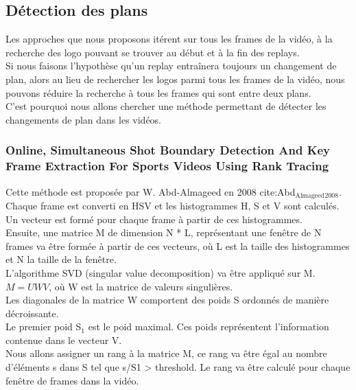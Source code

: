 \documentclass[11pt]{article}
\begin{document}
\subsection{Détection des plans}
\label{sec:orgd8e728c}
Les approches que nous proposons itérent sur tous les frames de la vidéo, à la recherche des logo pouvant se trouver au début et à la fin des replays.\\
Si nous faisons l'hypothèse qu'un replay entraînera toujours un changement de plan, alors au lieu de rechercher les logos parmi tous les frames de la vidéo, nous pouvons réduire la recherche à tous les frames qui sont entre deux plans.\\

C'est pourquoi nous allons chercher une méthode permettant de détecter les changements de plan dans les vidéos.\\

\subsubsection{Online, Simultaneous Shot Boundary Detection And Key Frame Extraction For Sports Videos Using Rank Tracing}
\label{sec:org95818b0}
Cette méthode est proposée par W. Abd-Almageed en 2008 cite:Abd\(_{\text{Almageed}}\)\(_{\text{2008}}\).\\

Chaque frame est converti en HSV et les histogrammes H, S et V sont calculés.\\
Un vecteur est formé pour chaque frame à partir de ces histogrammes.\\
Ensuite, une matrice M de dimension N * L, représentant une fenêtre de N frames va être formée à partir de ces vecteurs, où L est la taille des histogrammes et N la taille de la fenêtre.\\

L'algorithme SVD (singular value decomposition) va être appliqué sur M.  \(M = UWV\), où W est la matrice de valeurs singulières.\\

Les diagonales de la matrice W comportent des poids S ordonnés de manière décroissante.\\
Le premier poid S\(_{\text{1}}\) est le poid maximal. Ces poids représentent l'information contenue dans le vecteur V.\\

Nous allons assigner un rang à la matrice M,  ce rang va être égal au nombre d'éléments s dans S tel que s/S1 > threshold. Le rang va être calculé pour chaque fenêtre de frames dans la vidéo.\\
\end{document}
